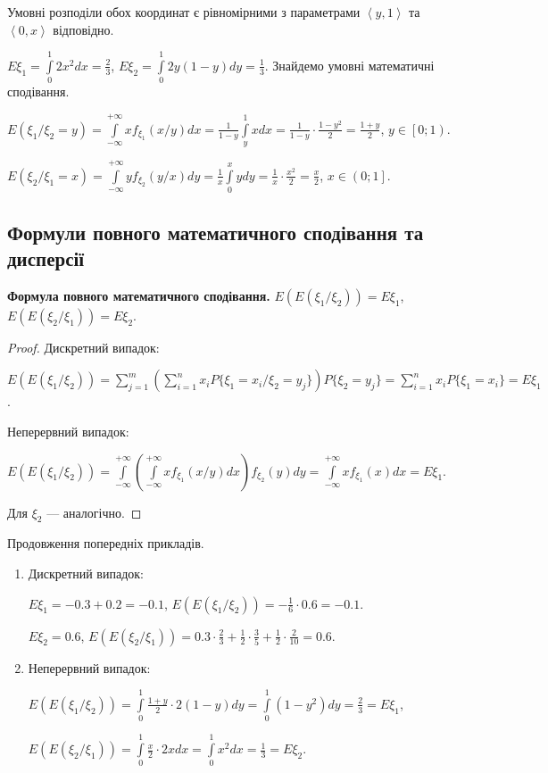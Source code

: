 \begin{example}
    Умовні розподіли обох координат є рівномірними з параметрами $\left< y, 1\right>$ та $\left<0, x\right>$ відповідно.

    $E\xi_1 = \int\limits_0^1 2x^2 dx = \frac{2}{3}$,
    $E\xi_2 = \int\limits_0^1 2y(1-y) dy = \frac{1}{3}$.
    Знайдемо умовні математичні сподівання.

    $E(\xi_1 / \xi_2 = y) = \int\limits_{-\infty}^{+\infty} x f_{\xi_1}(x/y)dx =
    \frac{1}{1-y} \int\limits_y^1 x dx = \frac{1}{1-y} \cdot \frac{1-y^2}{2} = \frac{1+y}{2}$, $y \in \left[ 0; 1\right)$.

    $E(\xi_2 / \xi_1 = x) = \int\limits_{-\infty}^{+\infty} y f_{\xi_2}(y/x)dy = 
    \frac{1}{x} \int\limits_0^x y dy = \frac{1}{x} \cdot \frac{x^2}{2} = \frac{x}{2}$, $x \in \left( 0; 1\right]$.
\end{example}
\subsection{Формули повного математичного сподівання та дисперсії}
\noindent\textbf{Формула повного математичного сподівання.}
    $E(E(\xi_1 / \xi_2)) = E\xi_1$, $E(E(\xi_2 / \xi_1)) = E\xi_2$.
\begin{proof}
    Дискретний випадок:

    $E(E(\xi_1 / \xi_2)) = \sum\limits_{j = 1}^m 
    \left(
        \sum\limits_{i=1}^n x_i P\{\xi_1 = x_i / \xi_2 = y_j\}
    \right) P\{\xi_2 = y_j\} = 
    \sum\limits_{i=1}^n x_i P\{\xi_1 = x_i\} = E\xi_1$.

    Неперервний випадок:

    $E(E(\xi_1 / \xi_2)) = \int\limits_{-\infty}^{+\infty} 
    \left(
        \int\limits_{-\infty}^{+\infty} x f_{\xi_1}(x / y) dx
    \right) f_{\xi_2}(y) dy
    = \int\limits_{-\infty}^{+\infty} x f_{\xi_1}(x) dx = E\xi_1$.

    Для $\xi_2$ --- аналогічно.
\end{proof}

\begin{example}
    Продовження попередніх прикладів.
    \begin{enumerate}
        \item Дискретний випадок:
        
        $E\xi_1 = -0.3 + 0.2 = -0.1$, $E(E(\xi_1 / \xi_2)) = -\frac{1}{6}
        \cdot0.6 = -0.1$.
    
        $E\xi_2 = 0.6$, $E(E(\xi_2 / \xi_1)) = 0.3\cdot\frac{2}{3} + 
        \frac{1}{2}\cdot\frac{3}{5} + \frac{1}{2} \cdot\frac{2}{10} = 
        0.6$.
        \item Неперервний випадок:

        $E(E(\xi_1 / \xi_2)) = \int\limits_0^1 \frac{1+y}{2} \cdot 2(1-y) dy = \int\limits_0^1 (1-y^2) dy = \frac{2}{3} = E\xi_1$,

        $E(E(\xi_2 / \xi_1)) = \int\limits_0^1 \frac{x}{2} \cdot 2x dx = \int\limits_0^1 x^2 dx = \frac{1}{3} = E\xi_2$.
    \end{enumerate}
\end{example}


